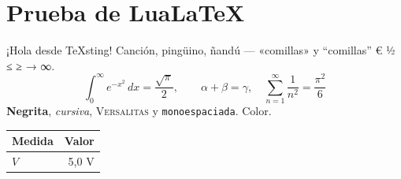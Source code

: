 \documentclass[11pt]{article}
\begin{document}
\section{Prueba de LuaLaTeX}
¡Hola desde TeXsting! Canción, pingüino, ñandú — «comillas» y “comillas” € ½ ≤ ≥ → ∞.
\[ \int_0^\infty e^{-x^2}\,dx = \frac{\sqrt{\pi}}{2}, \qquad α + β = γ, \quad \sum_{n=1}^{\infty} \frac{1}{n^2} = \frac{π^2}{6} \]
\textbf{Negrita}, \textit{cursiva}, \textsc{Versalitas} y \texttt{monoespaciada}. {\color{blue}Color.}
\begin{center}\begin{tabular}{lr}\toprule Medida & Valor\\\midrule $V$ & 5,0 V\\\bottomrule\end{tabular}\end{center}
\end{document}
